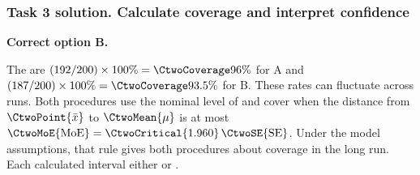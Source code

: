 \noindent\begin{minipage}{\linewidth}
\subsubsection*{Task 3 solution. Calculate coverage and interpret confidence}
\label{sol:c2-5-c}

\textbf{Correct option B.}

The  are $(192/200)\times100\%=\CtwoCoverage{96\%}$ for A and $(187/200)\times100\%=\CtwoCoverage{93.5\%}$ for B. These rates can fluctuate across runs. Both procedures use the nominal level of  and cover when the distance from $\CtwoPoint{\bar{x}}$ to $\CtwoMean{\mu}$ is at most $\CtwoMoE{\mathrm{MoE}}=\CtwoCritical{1.960}\,\CtwoSE{\mathrm{SE}}$. Under the model assumptions, that rule gives both procedures about  coverage in the long run. Each calculated interval either  or .

\par\vspace{3mm}
\end{minipage}\par


